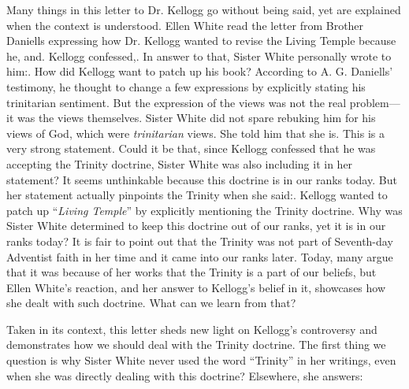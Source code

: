 Many things in this letter to Dr. Kellogg go without being said, yet are explained when the context is understood. Ellen White read the letter from Brother Daniells expressing how Dr. Kellogg wanted to revise the Living Temple because he, and. Kellogg confessed,. In answer to that, Sister White personally wrote to him:. How did Kellogg want to patch up his book? According to A. G. Daniells’ testimony, he thought to change a few expressions by explicitly stating his trinitarian sentiment. But the expression of the views was not the real problem—it was the views themselves. Sister White did not spare rebuking him for his views of God, which were \textit{trinitarian} views. She told him that she is. This is a very strong statement. Could it be that, since Kellogg confessed that he was accepting the Trinity doctrine, Sister White was also including it in her statement? It seems unthinkable because this doctrine is in our ranks today. But her statement actually pinpoints the Trinity when she said:. Kellogg wanted to patch up “\textit{Living Temple}” by explicitly mentioning the Trinity doctrine. Why was Sister White determined to keep this doctrine out of our ranks, yet it is in our ranks today? It is fair to point out that the Trinity was not part of Seventh-day Adventist faith in her time and it came into our ranks later. Today, many argue that it was because of her works that the Trinity is a part of our beliefs, but Ellen White’s reaction, and her answer to Kellogg’s belief in it, showcases how she dealt with such doctrine. What can we learn from that?

Taken in its context, this letter sheds new light on Kellogg’s controversy and demonstrates how we should deal with the Trinity doctrine. The first thing we question is why Sister White never used the word “Trinity” in her writings, even when she was directly dealing with this doctrine? Elsewhere, she answers: 

